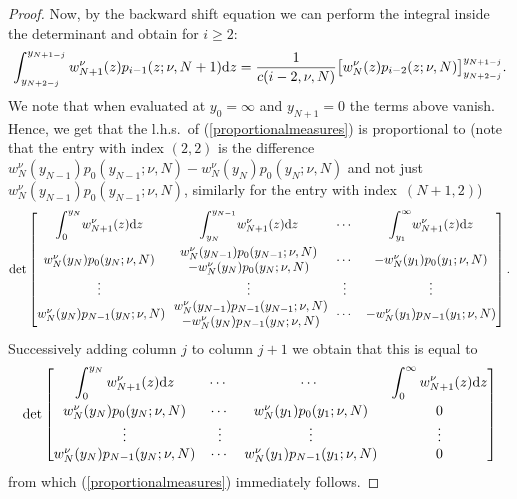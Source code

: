 \documentclass[pdftex]{sigma}
\numberwithin{equation}{section}
\begin{document}
\begin{proof}
Now, by the backward shift equation we can perform the integral inside the determinant and obtain for $i\ge 2$:
\begin{gather*}
\int_{y_{N+2-j}}^{y_{N+1-j}}w_{N+1}^{\nu}(z)p_{i-1} (z;\nu,N+1 ){\rm d}z=\frac{1}{c(i-2,\nu,N)}\big[w_{N}^{\nu}(z)p_{i-2}(z;\nu, N)\big]^{y_{N+1-j}}_{y_{N+2-j}}.
\end{gather*}
We note that when evaluated at $y_0=\infty$ and $y_{N+1}=0$ the terms above vanish. Hence, we get that the l.h.s.\ of (\ref{proportionalmeasures}) is proportional to (note that the entry with index $(2,2)$ is the difference $w_N^{\nu}(y_{N-1})p_0(y_{N-1};\nu, N)-w_N^{\nu}(y_N)p_0(y_N;\nu, N)$ and not just $w_N^{\nu}(y_{N-1})p_0(y_{N-1};\nu, N)$, similarly for the entry with index~$(N+1,2)$)
\begin{gather*}
\det\begin{bmatrix}
\displaystyle \int_{0}^{y_N}\!w_{N+1}^{\nu}(z){\rm d}z &\displaystyle \int_{y_N}^{y_{N-1}}\!w_{N+1}^{\nu}(z){\rm d}z &\cdots &\displaystyle \int_{y_1}^{\infty}\!w_{N+1}^{\nu}(z){\rm d}z\vspace{1mm}\\
 w_N^{\nu}(y_N)p_0(y_N;\nu, N) & \begin{matrix} w_N^{\nu}(y_{N-1})p_0(y_{N-1};\nu, N)\\ -w_N^{\nu}(y_N)p_0(y_N;\nu, N)\end{matrix} &\cdots & -w_N^{\nu}(y_1)p_0(y_1;\nu, N)\\
\vdots &\vdots &\vdots &\vdots\\
 w_N^{\nu}(y_N)p_{N-1}(y_N;\nu, N)\!\! & \begin{matrix} w_N^{\nu}(y_{N-1})p_{N-1}(y_{N-1};\nu, N)\\ -w_N^{\nu}(y_N)p_{N-1}(y_N;\nu, N)\end{matrix}\!\! &\cdots & -w_N^{\nu}(y_1)p_{N-1}(y_1;\nu, N)
\end{bmatrix}.
\end{gather*}
Successively adding column $j$ to column $j+1$ we obtain that this is equal to
\begin{gather*}
\det\begin{bmatrix}
\displaystyle \int_{0}^{y_N}w_{N+1}^{\nu}(z){\rm d}z & \cdots\ &\cdots \ &\displaystyle \int_{0}^{\infty}w_{N+1}^{\nu}(z){\rm d}z\vspace{1mm}\\
 w_N^{\nu}(y_N)p_0(y_N;\nu, N) &\cdots & w_N^{\nu}(y_1)p_{0}(y_1;\nu, N) & 0\\
\vdots &\vdots &\vdots &\vdots\\
 w_N^{\nu}(y_N)p_{N-1}(y_N;\nu, N) & \cdots & w_N^{\nu}(y_1)p_{N-1}(y_1;\nu, N) & 0
\end{bmatrix}
\end{gather*}
from which (\ref{proportionalmeasures}) immediately follows.
\end{proof}
\end{document}

